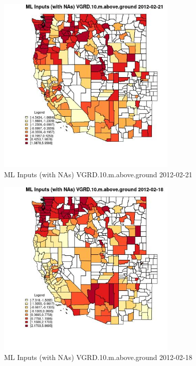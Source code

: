 \begin{figure} 
\centering  
\includegraphics[width=0.77\textwidth]{Code_Outputs/Report_ML_input_PM25_Step4_part_f_de_duplicated_aves_prioritize_24hr_obswNAs_CountyVGRD10mabovegroundMean2012-02-21.jpg} 
\caption{\label{fig:Report_ML_input_PM25_Step4_part_f_de_duplicated_aves_prioritize_24hr_obswNAsCountyVGRD10mabovegroundMean2012-02-21}ML Inputs (with NAs) VGRD.10.m.above.ground 2012-02-21} 
\end{figure} 
 

\begin{figure} 
\centering  
\includegraphics[width=0.77\textwidth]{Code_Outputs/Report_ML_input_PM25_Step4_part_f_de_duplicated_aves_prioritize_24hr_obswNAs_CountyVGRD10mabovegroundMean2012-02-18.jpg} 
\caption{\label{fig:Report_ML_input_PM25_Step4_part_f_de_duplicated_aves_prioritize_24hr_obswNAsCountyVGRD10mabovegroundMean2012-02-18}ML Inputs (with NAs) VGRD.10.m.above.ground 2012-02-18} 
\end{figure} 
 

